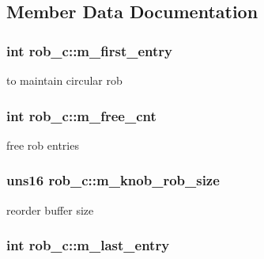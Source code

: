 \subsection{Member Data Documentation}
\hypertarget{classrob__c_a941fb62da6f46460bec3f738fda59aab}{
\subsubsection[{m\_\-first\_\-entry}]{\setlength{\rightskip}{0pt plus 5cm}int {\bf rob\_\-c::m\_\-first\_\-entry}}}
\label{classrob__c_a941fb62da6f46460bec3f738fda59aab}
to maintain circular rob \hypertarget{classrob__c_a80da438135b0e6e3d0c81e105fe34e8e}{
\subsubsection[{m\_\-free\_\-cnt}]{\setlength{\rightskip}{0pt plus 5cm}int {\bf rob\_\-c::m\_\-free\_\-cnt}}}
\label{classrob__c_a80da438135b0e6e3d0c81e105fe34e8e}
free rob entries \hypertarget{classrob__c_a9fac795612c146812ae2e8f3a5904e25}{
\subsubsection[{m\_\-knob\_\-rob\_\-size}]{\setlength{\rightskip}{0pt plus 5cm}uns16 {\bf rob\_\-c::m\_\-knob\_\-rob\_\-size}}}
\label{classrob__c_a9fac795612c146812ae2e8f3a5904e25}
reorder buffer size \hypertarget{classrob__c_a7420d155265448b2d0fcbbcae5293c05}{
\subsubsection[{m\_\-last\_\-entry}]{\setlength{\rightskip}{0pt plus 5cm}int {\bf rob\_\-c::m\_\-last\_\-entry}}}
